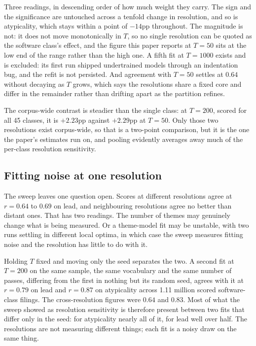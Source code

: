 \noindent Three readings, in descending order of how much weight they carry.
The sign and the significance are untouched across a tenfold change in
resolution, and so is atypicality, which stays within a point of $-14$pp
throughout. The magnitude is not: it does not move monotonically in $T$, so
no single resolution can be quoted as the software class's effect, and the
figure this paper reports at
$T = 50$ sits at the low end of the range rather than the high one. A fifth
fit at $T = 1000$ exists and is excluded: its first run shipped
undertrained models through an indentation bug, and the refit is not
persisted. And
agreement with $T = 50$ settles at $0.64$ without decaying as $T$ grows, which
says the resolutions share a fixed core and differ in the remainder rather than
drifting apart as the partition refines.

The corpus-wide contrast is steadier than the single class: at $T = 200$,
scored for all 45 classes, it is $+2.23$pp against $+2.29$pp at $T = 50$. Only
those two resolutions exist corpus-wide, so that is a two-point comparison, but
it is the one the paper's estimates run on, and pooling evidently averages away
much of the per-class resolution sensitivity.

\subsection{Fitting noise at one resolution}

The sweep leaves one question open. Scores at different resolutions agree at
$r = 0.64$ to $0.69$ on lead, and neighbouring resolutions agree no better than
distant ones. That has two readings. The number of themes may genuinely change
what is being measured. Or a theme-model fit may be unstable, with two runs settling in different
local optima, in which case the sweep measures
fitting noise and the resolution has little to do with it.

Holding $T$ fixed and moving only the seed separates the two. A second fit at
$T = 200$ on the same sample, the same vocabulary and the same number of
passes, differing from the first in nothing but its random seed, agrees with
it at $r = 0.79$ on lead and $r = 0.87$ on atypicality across 1.11 million
scored software-class filings. The cross-resolution figures were $0.64$ and
$0.83$. Most of what the sweep showed as resolution sensitivity is therefore
present between two fits that differ only in the seed: for atypicality nearly
all of it, for lead well over half. The resolutions are not measuring
different things; each fit is a noisy draw on the same thing.

